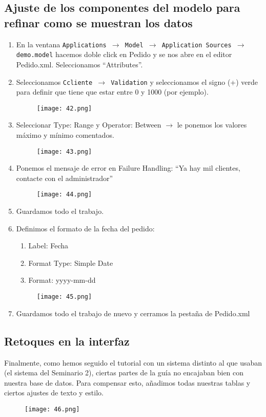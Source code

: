 \subsection{Ajuste de los componentes del modelo para refinar como se muestran los datos}
\begin{enumerate}
	\item En la ventana \texttt{Applications $\rightarrow$ Model $\rightarrow$ Application Sources $\rightarrow$ demo.model}  hacemos doble click en Pedido y se nos abre en el editor Pedido.xml. Seleccionamos ``Attributes''.
	\item Seleccionamos \texttt{Ccliente $\rightarrow$ Validation} y seleccionamos el signo (+) verde para definir que tiene que estar entre 0 y 1000 (por ejemplo).
	\pagebreak
	\begin{figure}[!h]
	  \centering
	    \texttt{[image: 42.png]}
	\end{figure}
	\item Seleccionar Type: Range y Operator: Between $\rightarrow$ le ponemos los valores máximo y mínimo comentados.
	\begin{figure}[!h]
	  \centering
	    \texttt{[image: 43.png]}
	\end{figure}
	\item Ponemos el mensaje de error en Failure Handling: ``Ya hay mil clientes, contacte con el administrador''
	\pagebreak
	\begin{figure}[!h]
	  \centering
	    \texttt{[image: 44.png]}
	\end{figure}
	\item Guardamos todo el trabajo.
	\item Definimos el formato de la fecha del pedido:
	\begin{enumerate}
		\item Label: Fecha
		\item Format Type: Simple Date
		\item Format: yyyy-mm-dd
	\end{enumerate}
	\begin{figure}[!h]
	  \centering
	    \texttt{[image: 45.png]}
	\end{figure}
	\item Guardamos todo el trabajo de nuevo y cerramos la pestaña de Pedido.xml
\end{enumerate}
\pagebreak
\subsection{Retoques en la interfaz}
Finalmente, como hemos seguido el tutorial con un sistema distinto al que usaban (el sistema del Seminario 2), ciertas partes de la guía no encajaban bien con nuestra base de datos. Para compensar esto, añadimos todas nuestras tablas y ciertos ajustes de texto y estilo.
\begin{figure}[!h]
  \centering
	 \texttt{[image: 46.png]}
\end{figure}

